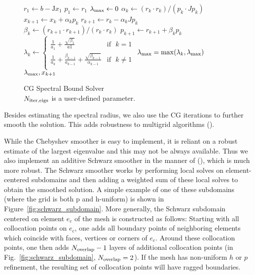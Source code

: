 \begin{figure}
  \begin{algorithm}[H]
    \caption{\label{alg:CG_Spectral_Bound_Solver}
      CG Spectral Bound Solver\\ $N_{\rm{iter,eigs}}$ is a user-defined parameter.
    }
    \begin{algorithmic}[1]
      \State $r_1 \leftarrow b - \mathrm{J}x_1$  
      \State $p_1 \leftarrow r_1$
      \State $\lambda_{\rm{max}} \leftarrow 0$
      \State $\alpha_k \leftarrow (r_{k} \cdot r_{k})/(p_k \cdot Jp_k)$
      \State $x_{k+1} \leftarrow x_{k} + \alpha_k p_k$
      \State $r_{k+1} \leftarrow r_{k} - \alpha_kJ p_k$
      \State $\beta_k \leftarrow (r_{k+1} \cdot r_{k+1})/(r_{k} \cdot r_{k})$ 
      \State $p_{k+1} \leftarrow r_{k+1} + \beta_kp_{k}$
      \State  $\lambda_k\leftarrow 
\begin{cases}
      \frac{1}{a_1} + \frac{\sqrt{\beta_1}}{a1} & \text{if} \,\,\,\, k = 1 \\[10pt]
    \frac{1}{a_{k}} + \frac{\beta_{k-1}}{a_{k-1}} + \frac{\sqrt{\beta_{k-1}}}{\alpha_{k-1}}  & \text{if} \,\,\,\, k \neq 1\\[10pt]
  \end{cases}
$\; 
\State  $\lambda_{\rm{max}} = \max(\lambda_k, \lambda_{\rm{max}})$
\EndFor\\
\Return $\lambda_{\rm{max}},x_{k + 1}$ 
  \EndFunction
    \end{algorithmic}
  \end{algorithm}
\end{figure}

Besides estimating the spectral radius, we also use the CG iterations to further smooth the
solution. This adds robustness to multigrid algorithms (\citet*{elman2001multigrid}).

While the Chebyshev smoother is easy to implement, it is reliant on a robust estimate of the largest eigenvalue and this may not be always available. Thus we also implement an additive Schwarz smoother in the manner of (\citet*{stiller2017robust}), which is much more robust. The Schwarz smoother works by performing local solves on element-centered subdomains and then adding a weighted sum of these local solves to obtain the smoothed solution. A simple example of one of these subdomains (where the grid is both p and h-uniform) is shown in Figure~\ref{fig:schwarz_subdomain}.
%
More generally, the Schwarz subdomain centered on element $e_c$
  of the mesh is constructed as follows: Starting with all collocation
  points on $e_c$, one adds all boundary points of neighboring elements
  which coincide with faces, vertices or corners of $e_c$.  Around these
  collocation points, one then
  adds $N_{\rm overlap}-1$ layers of additional collocation points (in Fig.~\ref{fig:schwarz_subdomain}, $N_{\rm overlap}=2$).  If the mesh has non-uniform $h$ or $p$ refinement, the resulting set of collocation points will have ragged boundaries.

